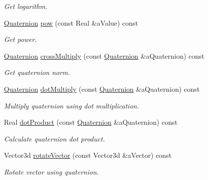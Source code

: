 \begin{DoxyCompactItemize}
\begin{DoxyCompactList}\small\item\em Get logarithm. \end{DoxyCompactList}\item 
\hyperlink{classostk_1_1math_1_1geom_1_1d3_1_1trf_1_1rot_1_1_quaternion}{Quaternion} \hyperlink{classostk_1_1math_1_1geom_1_1d3_1_1trf_1_1rot_1_1_quaternion_a3a2925f9a267c5f12f4419b7cf776614}{pow} (const Real \&a\+Value) const
\begin{DoxyCompactList}\small\item\em Get power. \end{DoxyCompactList}\item 
\hyperlink{classostk_1_1math_1_1geom_1_1d3_1_1trf_1_1rot_1_1_quaternion}{Quaternion} \hyperlink{classostk_1_1math_1_1geom_1_1d3_1_1trf_1_1rot_1_1_quaternion_a324f12e547fbeb114b4db5f9f26ae46f}{cross\+Multiply} (const \hyperlink{classostk_1_1math_1_1geom_1_1d3_1_1trf_1_1rot_1_1_quaternion}{Quaternion} \&a\+Quaternion) const
\begin{DoxyCompactList}\small\item\em Get quaternion norm. \end{DoxyCompactList}\item 
\hyperlink{classostk_1_1math_1_1geom_1_1d3_1_1trf_1_1rot_1_1_quaternion}{Quaternion} \hyperlink{classostk_1_1math_1_1geom_1_1d3_1_1trf_1_1rot_1_1_quaternion_a3daba388529ae95f39e89cb3a4ec9714}{dot\+Multiply} (const \hyperlink{classostk_1_1math_1_1geom_1_1d3_1_1trf_1_1rot_1_1_quaternion}{Quaternion} \&a\+Quaternion) const
\begin{DoxyCompactList}\small\item\em Multiply quaternion using dot multiplication. \end{DoxyCompactList}\item 
Real \hyperlink{classostk_1_1math_1_1geom_1_1d3_1_1trf_1_1rot_1_1_quaternion_aa7b7f1ecf3f95348af7b5f5dc5099ad5}{dot\+Product} (const \hyperlink{classostk_1_1math_1_1geom_1_1d3_1_1trf_1_1rot_1_1_quaternion}{Quaternion} \&a\+Quaternion) const
\begin{DoxyCompactList}\small\item\em Calculate quaternion dot product. \end{DoxyCompactList}\item 
Vector3d \hyperlink{classostk_1_1math_1_1geom_1_1d3_1_1trf_1_1rot_1_1_quaternion_a97cb078bf9b67179cb1553d92617bb99}{rotate\+Vector} (const Vector3d \&a\+Vector) const
\begin{DoxyCompactList}\small\item\em Rotate vector using quaternion. \end{DoxyCompactList}\item 

\end{DoxyCompactItemize}
